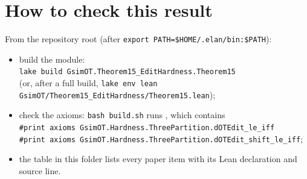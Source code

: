\section{How to check this result}
From the repository root (after \texttt{export PATH=\$HOME/.elan/bin:\$PATH}):
\begin{itemize}
\item build the module:\\ \texttt{lake build GsimOT.Theorem15\_EditHardness.Theorem15}\\
  (or, after a full build, \texttt{lake env lean GsimOT/Theorem15\_EditHardness/Theorem15.lean});
\item check the axioms: \texttt{bash build.sh} runs , which contains\\
  \texttt{\#print axioms GsimOT.Hardness.ThreePartition.dOTEdit\_le\_iff}\\
  \texttt{\#print axioms GsimOT.Hardness.ThreePartition.dOTEdit\_shift\_le\_iff};
\item the table  in this folder lists every paper item with its Lean
  declaration and source line.
\end{itemize}

